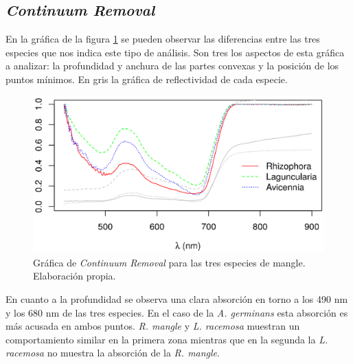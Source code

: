 
\subsection{\textit{Continuum Removal}}
En la gráfica de la figura \ref{fig:GraficaCR} se pueden observar las diferencias entre las tres especies que nos indica este tipo de análisis. Son tres los aspectos de esta gráfica a analizar: la profundidad y anchura de las partes convexas y la posición de los puntos mínimos. En gris la gráfica de reflectividad de cada especie.%

\begin{figure}
	\centering
	\includegraphics[width=0.8\linewidth]{./Imagenes/ContinuumR2.eps}
	\caption[Gráfica de \textit{Continuum Removal}]{Gráfica de \textit{Continuum Removal} para las tres especies de mangle. Elaboración propia.}
	\label{fig:GraficaCR}
\end{figure}

En cuanto a la profundidad se observa una clara absorción en torno a los 490 nm y los 680 nm de las tres especies. En el caso de la \textit{A. germinans} esta absorción es más acusada en ambos puntos. \textit{R. mangle} y \textit{L. racemosa} muestran un comportamiento similar en la primera zona mientras que en la segunda la \textit{L. racemosa} no muestra la absorción de la \textit{R. mangle}.%

